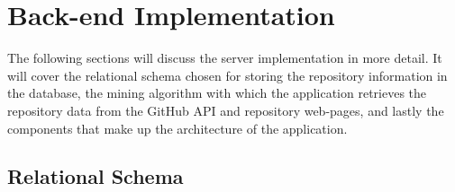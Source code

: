 \chapter{Back-end Implementation}\label{ch:4}

The following sections will discuss the server implementation in more detail.
It will cover the relational schema chosen for storing the repository information in the database, the mining algorithm with which the application retrieves the repository data from the GitHub API and repository web-pages, and lastly the components that make up the architecture of the application.

\section{Relational Schema}

